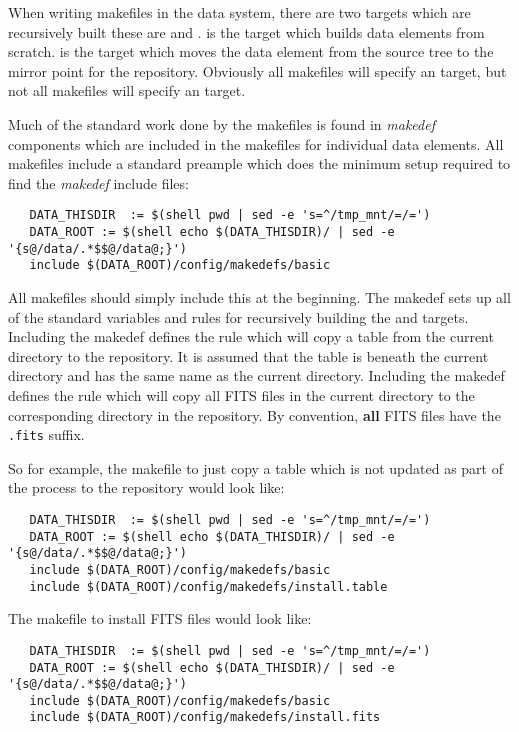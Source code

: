 When writing makefiles in the data system, there are two targets which
are recursively built these are  and . 
is the target which builds data elements from scratch.  is
the target which moves the data element from the source tree to the
mirror point for the repository. Obviously all makefiles will specify
an  target, but not all makefiles will specify an 
target.

Much of the standard work done by the makefiles is found in \textit{makedef}
components which are included in the makefiles for individual data
elements. All makefiles include a standard preample which does the minimum
setup required to find the \textit{makedef} include files:

\begin{verbatim}
   DATA_THISDIR  := $(shell pwd | sed -e 's=^/tmp_mnt/=/=')
   DATA_ROOT := $(shell echo $(DATA_THISDIR)/ | sed -e '{s@/data/.*$$@/data@;}')
   include $(DATA_ROOT)/config/makedefs/basic
\end{verbatim}

\noindent
All makefiles should simply include this at the beginning. The  makedef
sets up all of the standard variables and rules for recursively building the
 and  targets. Including the 
makedef defines the rule which will copy a table from the current directory
to the repository. It is assumed that the table is beneath the current directory
and has the same name as the current directory. Including the 
makedef defines the rule which will copy all FITS files in the current directory
to the corresponding directory in the repository. By convention, \textbf{all}
FITS files have the \verb+.fits+ suffix.

So for example, the makefile to just copy a table which is not updated as
part of the  process to the repository would look like:

\begin{verbatim}
   DATA_THISDIR  := $(shell pwd | sed -e 's=^/tmp_mnt/=/=')
   DATA_ROOT := $(shell echo $(DATA_THISDIR)/ | sed -e '{s@/data/.*$$@/data@;}')
   include $(DATA_ROOT)/config/makedefs/basic
   include $(DATA_ROOT)/config/makedefs/install.table
\end{verbatim}

\noindent
The makefile to install FITS files would look like:

\begin{verbatim}
   DATA_THISDIR  := $(shell pwd | sed -e 's=^/tmp_mnt/=/=')
   DATA_ROOT := $(shell echo $(DATA_THISDIR)/ | sed -e '{s@/data/.*$$@/data@;}')
   include $(DATA_ROOT)/config/makedefs/basic
   include $(DATA_ROOT)/config/makedefs/install.fits
\end{verbatim}

